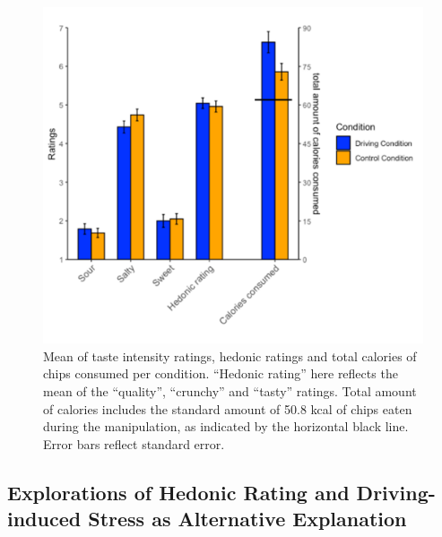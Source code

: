 \documentclass[authordate, empirical, issue]{jote-new-article}
\begin{document}
\begin{figure}[t!]
  \begin{fullwidth}
    \includegraphics[width=\linewidth]{media/image2.png}
    \caption{Mean of taste intensity ratings, hedonic ratings and total calories of chips consumed per condition. “Hedonic rating” here reflects the mean of the “quality”, “crunchy” and “tasty” ratings. Total amount of calories includes the standard amount of 50.8 kcal of chips eaten during the manipulation, as indicated by the horizontal black line. Error bars reflect standard error.}
  \end{fullwidth}
  \label{fig:rId14}

\end{figure}









\subsection{Explorations of Hedonic Rating and Driving-induced Stress as Alternative Explanation }

\vspace*{-1\baselineskip}
\end{document}
